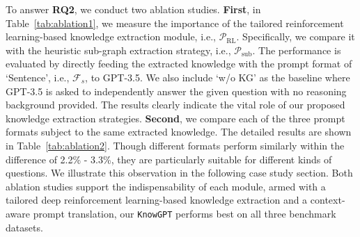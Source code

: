 \documentclass{article}
\theoremstyle{boldremark}
\begin{document}
To answer \textbf{RQ2}, we conduct two ablation studies. \textbf{First}, in Table~\ref{tab:ablation1}, we measure the importance of the tailored reinforcement learning-based knowledge extraction module, i.e., $\mathcal{P}_\text{RL}$. Specifically, we compare it with the heuristic sub-graph extraction strategy, i.e., $\mathcal{P}_\text{sub}$. The performance is evaluated by directly feeding the extracted knowledge with the prompt format of `Sentence', i.e., $\mathcal{F}_{s}$, to GPT-3.5. We also include `w/o KG' as the baseline where GPT-3.5 is asked to independently answer the given question with no reasoning background provided. The results clearly indicate the vital role of our proposed knowledge extraction strategies. \textbf{Second}, we compare each of the three prompt formats subject to the same extracted knowledge. The detailed results are shown in Table~\ref{tab:ablation2}. Though different formats perform similarly within the difference of 2.2\% - 3.3\%, they are particularly suitable for different kinds of questions. We illustrate this observation in the following case study section. Both ablation studies support the indispensability of each module, armed with a tailored deep reinforcement learning-based knowledge extraction and a context-aware prompt translation, our \texttt{KnowGPT} performs best on all three benchmark datasets.
\end{document}
